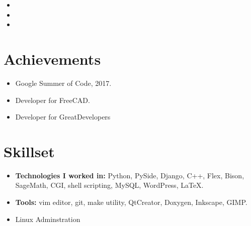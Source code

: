 \documentclass[11pt,a4paper,sans]{moderncv}        %
\begin{document}
\vspace{6pt}

\begin{itemize}

\item{}

\item{}  %

\item{}

\end{itemize}

\section{Achievements}

\vspace{6pt}

\begin{itemize}

\item Google Summer of Code, 2017.

\vspace{6pt}

\item Developer for FreeCAD.

\vspace{6pt}

\item Developer for GreatDevelopers

\end{itemize}

\section{Skillset}

\vspace{6pt}
 
\begin{itemize}

\item \textbf{Technologies I worked in:} Python, PySide, Django, C++, Flex, Bison, SageMath, CGI, shell scripting, MySQL, WordPress, LaTeX.

\item \textbf{Tools:} vim editor, git, make utility, QtCreator, Doxygen, Inkscape, GIMP.

\item Linux Adminstration
\end{itemize}
\end{document}
